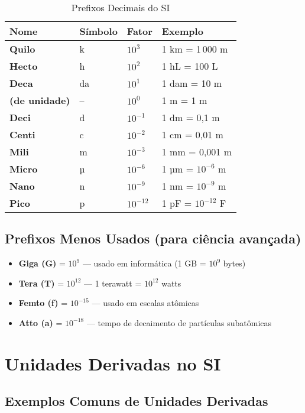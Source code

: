 \documentclass[portuguese,11pt,a4paper,oneside,onecolumn,notitlepage]{article}
\begin{document}
	\begin{table}[H]
		\centering
		\begin{tabular}{>{\bfseries}l l l l}
			\toprule
			Nome & Símbolo & Fator & Exemplo \\
			\midrule
			Quilo & k & $10^3$ & 1 km = 1\,000 m \\
			Hecto & h & $10^2$ & 1 hL = 100 L \\
			Deca & da & $10^1$ & 1 dam = 10 m \\
			(de unidade) & – & $10^0$ & 1 m = 1 m \\
			Deci & d & $10^{-1}$ & 1 dm = 0{,}1 m \\
			Centi & c & $10^{-2}$ & 1 cm = 0{,}01 m \\
			Mili & m & $10^{-3}$ & 1 mm = 0{,}001 m \\
			Micro & µ & $10^{-6}$ & 1 µm = $10^{-6}$ m \\
			Nano & n & $10^{-9}$ & 1 nm = $10^{-9}$ m \\
			Pico & p & $10^{-12}$ & 1 pF = $10^{-12}$ F \\
			\bottomrule
		\end{tabular}
		\caption{Prefixos Decimais do SI}
	\end{table}
	
	\subsection*{Prefixos Menos Usados (para ciência avançada)}
	
	\begin{itemize}
		\item \textbf{Giga (G)} = $10^9$ — usado em informática (1 GB = $10^9$ bytes)
		\item \textbf{Tera (T)} = $10^{12}$ — 1 terawatt = $10^{12}$ watts
		\item \textbf{Femto (f)} = $10^{-15}$ — usado em escalas atômicas
		\item \textbf{Atto (a)} = $10^{-18}$ — tempo de decaimento de partículas subatômicas
	\end{itemize}
	
	\section{Unidades Derivadas no SI}
	
	\subsection*{Exemplos Comuns de Unidades Derivadas}
	
\end{document}
